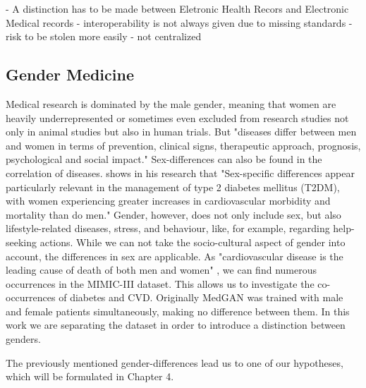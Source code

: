 \documentclass[11pt, a4paper]{book}
\begin{document}
- A distinction has to be made between Eletronic Health Recors and Electronic Medical records
- interoperability is not always given due to missing standards
- risk to be stolen more easily
- not centralized 

\subsection{Gender Medicine}
Medical research is dominated by the male gender, meaning that women are heavily underrepresented or sometimes even excluded from research studies not only in animal studies but also in human trials. \cite{baggio2013gender} 
But "diseases  differ  between  men  and  women  in  terms  of  prevention,  clinical  signs,  therapeutic  approach,  prognosis,  psychological  and  social  impact." \cite{baggio2013gender}
Sex-differences can also be found in the correlation of diseases. \cite{kautzky2010sex} shows in his research that "Sex-specific differences appear particularly relevant in the management of type 2 diabetes mellitus (T2DM), with women experiencing greater increases in cardiovascular morbidity and mortality than do men." \cite{kautzky2010sex}
Gender, however, does not only include sex, but also lifestyle-related diseases, stress, and behaviour, like, for example, regarding help-seeking actions.
While we can not take the socio-cultural aspect of gender into account, the differences in sex are applicable.
As "cardiovascular disease is the leading cause of death of both men and women" \cite{arain2009sex}, we can find numerous occurrences in the MIMIC-III dataset. This allows us to investigate the co-occurrences of diabetes and CVD.
Originally MedGAN was trained with male and female patients simultaneously, making no difference between them. In this work we are separating the dataset in order to introduce a distinction between genders.

The previously mentioned gender-differences lead us to one of our hypotheses, which will be formulated in Chapter 4.
\end{document}
